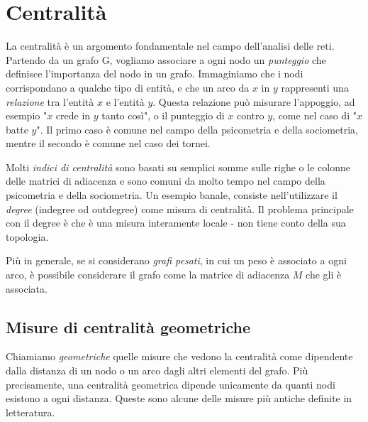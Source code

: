 \chapter{Centralità}
La centralità è un argomento fondamentale nel campo dell'analisi delle reti. Partendo da un grafo G, vogliamo associare a ogni nodo un \textit{punteggio} che definisce l'importanza del nodo in un grafo. Immaginiamo che i nodi corrispondano a qualche tipo di entità, e che un arco da $x$ in $y$ rappresenti una \textit{relazione} tra l'entità $x$ e l'entità $y$. Questa relazione può misurare l'appoggio, ad esempio "$x$ crede in $y$ tanto così", o il punteggio di $x$ contro $y$, come nel caso di "$x$ batte $y$". Il primo caso è comune nel campo della psicometria e della sociometria, mentre il secondo è comune nel caso dei tornei.

Molti \textit{indici di centralità} sono basati su semplici somme sulle righe o le colonne delle matrici di adiacenza e sono comuni da molto tempo nel campo della psicometria e della sociometria. Un esempio banale, consiste nell'utilizzare il \textit{degree} (indegree od outdegree) come misura di centralità. Il problema principale con il degree è che è una misura interamente locale - non tiene conto della sua topologia.

Più in generale, se si considerano \textit{grafi pesati}, in cui un peso è associato a ogni arco, è possibile considerare il grafo come la matrice di adiacenza $M$ che gli è associata.
\section{Misure di centralità geometriche}
Chiamiamo \textit{geometriche} quelle misure che vedono la centralità come dipendente dalla distanza di un nodo o un arco dagli altri elementi del grafo. Più precisamente, una centralità geometrica dipende unicamente da quanti nodi esistono a ogni distanza. Queste sono alcune delle misure più antiche definite in letteratura.
